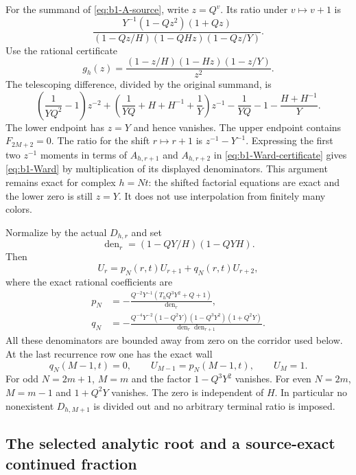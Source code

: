 For the summand of \eqref{eq:b1-A-source}, write $z=Q^v$. Its ratio
under $v\mapsto v+1$ is
\[
 \frac{Y^{-1}(1-Qz^2)(1+Qz)}
 {(1-Qz/H)(1-QHz)(1-Qz/Y)}.
\]
Use the rational certificate
\[
 g_h(z)=\frac{(1-z/H)(1-Hz)(1-z/Y)}{z^2}.
\]
The telescoping difference, divided by the original summand, is
\begin{equation}\label{eq:b1-Ward-certificate}
 \left(\frac1{YQ^2}-1\right)z^{-2}
 +\left(\frac1{YQ}+H+H^{-1}+\frac1Y\right)z^{-1}
 -\frac1{YQ}-1-\frac{H+H^{-1}}Y.
\end{equation}
The lower endpoint has $z=Y$ and hence vanishes. The upper endpoint
contains $F_{2M+2}=0$. The ratio for the shift $r\mapsto r+1$ is
$z^{-1}-Y^{-1}$. Expressing the first two $z^{-1}$ moments in terms of
$A_{h,r+1}$ and $A_{h,r+2}$ in
\eqref{eq:b1-Ward-certificate} gives \eqref{eq:b1-Ward} by multiplication
of its displayed denominators. This argument remains exact for complex
$h=Nt$: the shifted factorial equations are exact and the lower zero
is still $z=Y$. It does not use interpolation from finitely many colors.

Normalize by the actual $D_{h,r}$ and set
\[
 \operatorname{den}_r=(1-QY/H)(1-QYH).
\]
Then
\begin{equation}\label{eq:b1-normalized-recurrence}
 U_r=p_N(r,t)U_{r+1}+q_N(r,t)U_{r+2},
\end{equation}
where the exact rational coefficients are
\begin{align}
 p_N&=-\frac{Q^{-2}Y^{-1}(T_hQ^3Y^2+Q+1)}
                 {\operatorname{den}_r},
 \label{eq:b1-p-coefficient}\\
 q_N&=-\frac{Q^{-4}Y^{-2}(1-Q^2Y)(1-Q^3Y^2)(1+Q^2Y)}
 {\operatorname{den}_r\operatorname{den}_{r+1}}.
 \label{eq:b1-q-coefficient}
\end{align}
All these denominators are bounded away from zero on the corridor used
below. At the last recurrence row one has the exact wall
\begin{equation}\label{eq:b1-wall}
 q_N(M-1,t)=0,
 \qquad U_{M-1}=p_N(M-1,t),\qquad U_M=1.
\end{equation}
For odd $N=2m+1$, $M=m$ and the factor $1-Q^3Y^2$ vanishes.
For even $N=2m$, $M=m-1$ and $1+Q^2Y$ vanishes.
The zero is independent of $H$. In particular no nonexistent
$D_{h,M+1}$ is divided out and no arbitrary terminal ratio is imposed.

\subsection{The selected analytic root and a source-exact continued fraction}

